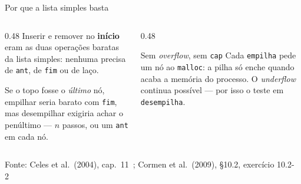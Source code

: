 \documentclass[aspectratio=169]{beamer}
\newcommand{\fonte}[1]{\vfill\hfill{\scriptsize\textcolor{UFSGray}{Fonte: #1}}}
\begin{document}
\begin{frame}{Por que a lista simples basta}
  \begin{columns}[T]
    \begin{column}{0.48\textwidth}
      \small
      Inserir e remover no \textbf{início} eram as duas operações baratas da
      lista simples: nenhuma precisa de \texttt{ant}, de \texttt{fim} ou de
      laço.

      \medskip
      Se o topo fosse o \emph{último} nó, empilhar seria barato com
      \texttt{fim}, mas desempilhar exigiria achar o penúltimo --- $n$
      passos, ou um \texttt{ant} em cada nó.
    \end{column}
    \begin{column}{0.48\textwidth}
      \begin{block}{Sem \emph{overflow}, sem \texttt{cap}}
        \small Cada \texttt{empilha} pede um nó ao \texttt{malloc}: a pilha
        só enche quando acaba a memória do processo. O \emph{underflow}
        continua possível --- por isso o teste em \texttt{desempilha}.
      \end{block}
    \end{column}
  \end{columns}
  \fonte{Celes et al.\ (2004), cap.~11~\cite{celes2004introducao};
    Cormen et al.\ (2009), §10.2, exercício 10.2-2~\cite{cormen2009introduction}}
\end{frame}
\end{document}
